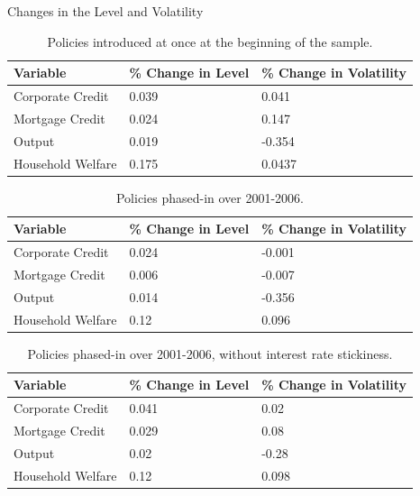 \documentclass[8pt,aspectratio=169]{beamer}
\numberwithin{equation}{section}
\begin{document}
\begin{frame}{Changes in the Level and Volatility}

\begin{table}[h]
\caption{Policies introduced at once at the beginning of the sample. }
\begin{tabular}{l|l|l}
Variable & \% Change in Level & \% Change in Volatility \\
\hline
\hline
    Corporate Credit           &       0.039    &      0.041 \\
    Mortgage Credit            &      0.024    &       0.147 \\
    Output         &     0.019    &    -0.354 \\ 
    Household Welfare       &     0.175     &     0.0437\\
\end{tabular}
\end{table}



\begin{table}[h]
\caption{Policies phased-in over 2001-2006.}
\begin{tabular}{l|l|l}
\small
Variable & \% Change in Level & \% Change in Volatility \\
\hline
\hline
    Corporate Credit           &       0.024    &      -0.001 \\
    Mortgage Credit            &      0.006    &       -0.007 \\
    Output         				&     0.014    &    -0.356 \\ 
    Household Welfare       &     0.12     &     0.096\\
\end{tabular}
\end{table}




\begin{table}[h]
\caption{Policies phased-in over 2001-2006, without interest rate stickiness.}
\begin{tabular}{l|l|l}
\small
Variable & \% Change in Level & \% Change in Volatility \\
\hline
\hline
    Corporate Credit           &       0.041    &     0.02 \\
    Mortgage Credit            &      0.029    &      0.08 \\
    Output         				&     0.02    &    -0.28 \\ 
    Household Welfare       &     0.12     &     0.098\\
\end{tabular}
\end{table}



\end{frame}
\end{document}
